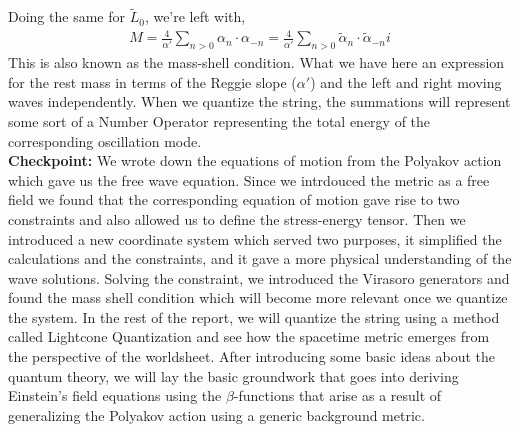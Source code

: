 \documentclass{article}
\begin{document}
Doing the same for $\tilde{L}_0$, we're left with,
\begin{align}
	M = \frac{4}{\alpha'}\sum_{n>0}\alpha_n\cdot\alpha_{-n}=\frac{4}{\alpha'}\sum_{n>0}\tilde{\alpha}_n\cdot\tilde{\alpha}_{-n}i\label{eq:levelmatching}
\end{align}
This is also known as the mass-shell condition. What we have here an expression for the rest mass in terms of the Reggie slope ($\alpha'$) and the left and right moving waves independently. When we quantize the string, the summations will represent some sort of a Number Operator representing the total energy of the corresponding oscillation mode.\\

\textbf{Checkpoint:} We wrote down the equations of motion from the Polyakov action which gave us the free wave equation. Since we intrdouced the metric as a free field we found that the corresponding equation of motion gave rise to two constraints and also allowed us to define the stress-energy tensor. Then we introduced a new coordinate system which served two purposes, it simplified the calculations and the constraints, and it gave a more physical understanding of the wave solutions. Solving the constraint, we introduced the Virasoro generators and found the mass shell condition which will become more relevant once we quantize the system. In the rest of the report, we will quantize the string using a method called Lightcone Quantization and see how the spacetime metric emerges from the perspective of the worldsheet. After introducing some basic ideas about the quantum theory, we will lay the basic groundwork that goes into deriving Einstein's field equations using the $\beta$-functions that arise as a result of generalizing the Polyakov action using a generic background metric.
\end{document}
